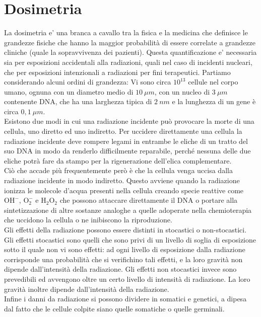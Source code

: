 
\chapter{Dosimetria}
La dosimetria e' una branca a cavallo tra la fisica e la medicina che definisce le grandezze fisiche che hanno la maggior probabilità di essere correlate a grandezze cliniche (quale la sopravvivenza dei pazienti). Questa quantificazione e' necessaria sia per esposizioni accidentali alla radiazioni, quali nel caso di incidenti nucleari, che per esposizioni intenzionali a radiazioni per fini terapeutici. Partiamo considerando alcuni ordini di grandezza:
Vi sono circa $10^{13}$ cellule nel corpo umano, ognuna con un diametro medio di $10 \ \mu m$, con un nucleo di $3 \ \mu m$ contenente DNA, che ha una larghezza tipica di $ 2 \ nm$ e la lunghezza di un gene è circa $0,1 \ \mu m$.  \\

Esistono due modi in cui una radiazione incidente può provocare la morte di una cellula, uno diretto ed uno indiretto. Per uccidere direttamente una cellula la radiazione incidente deve rompere legami in entrambe le eliche di un tratto del suo DNA in modo da renderlo difficilmente reparabile, perché nessuna delle due eliche potrà fare da stampo per la rigenerazione dell'elica complementare. \\
Ciò che accade più frequentemente però è che la cellula venga uccisa dalla radiazione incidente in modo indiretto. Questo avviene quando la radiazione ionizza le molecole d'acqua presenti nella cellula creando specie reattive come $\text{OH}^{-}$, $\text{O}_2^{-}$ e $\text{H}_2\text{O}_2$ che possono attaccare direttamente il DNA o portare alla sintetizzazione di altre sostanze analoghe a quelle adoperate nella chemioterapia che uccidono la cellula o ne inibiscono la riproduzione.\\
Gli effetti della radiazione possono essere distinti in stocastici o non-stocastici. Gli effetti stocastici sono quelli che sono privi di un livello di soglia di esposizione sotto il quale non vi sono effetti: ad ogni livello di esposizione dalla radiazione corrisponde una probabilità che si verifichino tali effetti, e la loro gravità non dipende dall'intensità della radiazione. Gli effetti non stocastici invece sono prevedibili ed avvengono oltre un certo livello di intensità di radiazione. La loro gravità inoltre dipende dall'intensità della radiazione.\\
Infine i danni da radiazione si possono dividere in somatici e genetici, a dipesa dal fatto che le cellule colpite siano quelle somatiche o quelle germinali.


